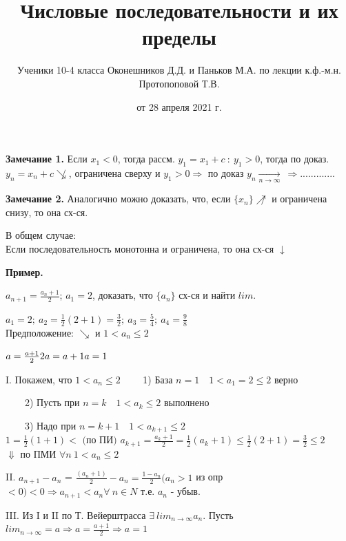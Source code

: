 \documentclass{article}
\begin{document}
    \textbf{Замечание 1.} 
    Если \(x_1 < 0\), тогда рассм. \(y_1 = x_1 + c\ : \ y_1 > 0\), тогда по доказ. \( y_n = x_n + c \not\searrow \), ограничена сверху и \( y_1 > 0 \Rightarrow \) по доказ \(y_n \xrightarrow[n \rightarrow \infty]{}\ \Rightarrow ............. \)
    
    \textbf{Замечание 2.}
    Аналогично можно доказать, что, если \(\{x_n\} \not\nearrow\) и ограничена снизу, то она сх-ся.
    
    В общем случае:
    \\ Если последовательность монотонна и ограничена, то она сх-ся \(\downarrow\)
    
    \textbf{Пример.}

    \(a_{n+1} = \frac{a_n + 1}{2}\); \(a_1 = 2\), доказать, что \(\{a_n\}\) сх-ся и найти \(lim\).

    \(a_1 = 2;\ a_2 = \frac{1}{2}(2+1) = \frac{3}{2};\ a_3 = \frac{5}{4};\ a_4 = \frac{9}{8}\)
    \\ Предположение: \(\searrow\) и \(1 < a_n \leq 2\)

    \(a = \frac{a+1}{2} \\ 2a = a + 1 \\ a = 1\)

    I. Покажем, что \(1 < a_n \leq 2\)
    \ \ \ \ 1) База \(n = 1 \quad 1 < a_1 = 2 \leq 2\) верно

    \ \ \ \ 2) Пусть при \(n = k \quad 1 < a_k \leq 2\) выполнено

    \ \ \ \ 3) Надо при \(n = k + 1 \quad 1 < a_{k+1} \leq 2\)
    \\ \(1 = \frac{1}{2}(1+1) < \textrm{ (по ПИ) } a_{k+1} = \frac{a_k + 1}{2} = \frac{1}{2}(a_k + 1) \leq \frac{1}{2}(2 + 1) = \frac{3}{2} \leq 2\)
    \\ \(\Downarrow\) по ПМИ \(\forall n \ 1 < a_n \leq 2\)

    II. \( a_{n+1} - a_n \) = \( \frac{(a_n+1)}{2} - a_n = \frac{1-a_n}{2} (a_n > 1\) из опр \(<0) < 0 \Rightarrow a_{n+1} < a_n \forall\ n \in N \) т.е. \( a_n \) - убыв.

    III. Из I и II по Т. Вейерштрасса \( \exists\ lim_{n \rightarrow \infty}a_n \). Пусть \(lim_{n \rightarrow \infty } = a \Rightarrow a = \frac{a + 1}{2} \Rightarrow a = 1 \)


\title{Числовые последовательности и их пределы}
\author{Ученики 10-4 класса Оконешников Д.Д. и Паньков М.А. по лекции к.ф.-м.н. Протопоповой Т.В.}
\date{от 28 апреля 2021 г.}
\maketitle
\end{document}
